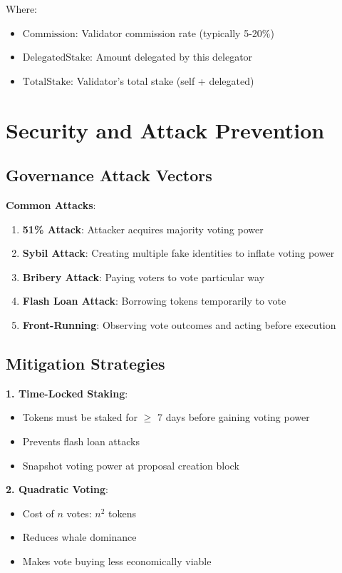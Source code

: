\documentclass[11pt,a4paper]{article}
\begin{document}
Where:
\begin{itemize}
\item $\text{Commission}$: Validator commission rate (typically 5-20\%)
\item $\text{DelegatedStake}$: Amount delegated by this delegator
\item $\text{TotalStake}$: Validator's total stake (self + delegated)
\end{itemize}

\section{Security and Attack Prevention}

\subsection{Governance Attack Vectors}

\textbf{Common Attacks}:
\begin{enumerate}
\item \textbf{51\% Attack}: Attacker acquires majority voting power
\item \textbf{Sybil Attack}: Creating multiple fake identities to inflate voting power
\item \textbf{Bribery Attack}: Paying voters to vote particular way
\item \textbf{Flash Loan Attack}: Borrowing tokens temporarily to vote
\item \textbf{Front-Running}: Observing vote outcomes and acting before execution
\end{enumerate}

\subsection{Mitigation Strategies}

\textbf{1. Time-Locked Staking}:
\begin{itemize}
\item Tokens must be staked for $\geq$ 7 days before gaining voting power
\item Prevents flash loan attacks
\item Snapshot voting power at proposal creation block
\end{itemize}

\textbf{2. Quadratic Voting}:
\begin{itemize}
\item Cost of $n$ votes: $n^2$ tokens
\item Reduces whale dominance
\item Makes vote buying less economically viable
\end{itemize}
\end{document}
